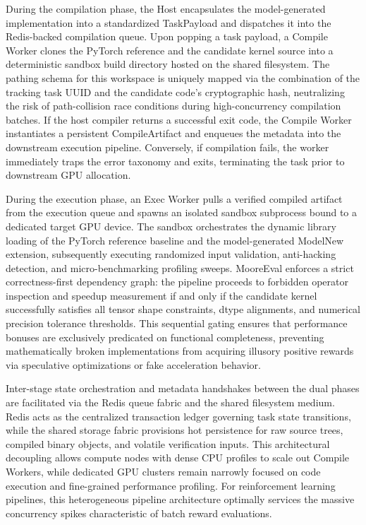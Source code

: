 \documentclass[
  10
]{article}
\begin{document}
During the compilation phase, the Host encapsulates the model-generated
implementation into a standardized TaskPayload and dispatches it into
the Redis-backed compilation queue. Upon popping a task payload, a
Compile Worker clones the PyTorch reference and the candidate kernel
source into a deterministic sandbox build directory hosted on the shared
filesystem. The pathing schema for this workspace is uniquely mapped via
the combination of the tracking task UUID and the candidate code's
cryptographic hash, neutralizing the risk of path-collision race
conditions during high-concurrency compilation batches. If the host
compiler returns a successful exit code, the Compile Worker instantiates
a persistent CompileArtifact and enqueues the metadata into the
downstream execution pipeline. Conversely, if compilation fails, the
worker immediately traps the error taxonomy and exits, terminating the
task prior to downstream GPU allocation.

During the execution phase, an Exec Worker pulls a verified compiled
artifact from the execution queue and spawns an isolated sandbox
subprocess bound to a dedicated target GPU device. The sandbox
orchestrates the dynamic library loading of the PyTorch reference
baseline and the model-generated ModelNew extension, subsequently
executing randomized input validation, anti-hacking detection, and
micro-benchmarking profiling sweeps. MooreEval enforces a strict
correctness-first dependency graph: the pipeline proceeds to forbidden
operator inspection and speedup measurement if and only if the candidate
kernel successfully satisfies all tensor shape constraints, dtype
alignments, and numerical precision tolerance thresholds. This
sequential gating ensures that performance bonuses are exclusively
predicated on functional completeness, preventing mathematically broken
implementations from acquiring illusory positive rewards via speculative
optimizations or fake acceleration behavior.

Inter-stage state orchestration and metadata handshakes between the dual
phases are facilitated via the Redis queue fabric and the shared
filesystem medium. Redis acts as the centralized transaction ledger
governing task state transitions, while the shared storage fabric
provisions hot persistence for raw source trees, compiled binary
objects, and volatile verification inputs. This architectural decoupling
allows compute nodes with dense CPU profiles to scale out Compile
Workers, while dedicated GPU clusters remain narrowly focused on code
execution and fine-grained performance profiling. For reinforcement
learning pipelines, this heterogeneous pipeline architecture optimally
services the massive concurrency spikes characteristic of batch reward
evaluations.
\end{document}
